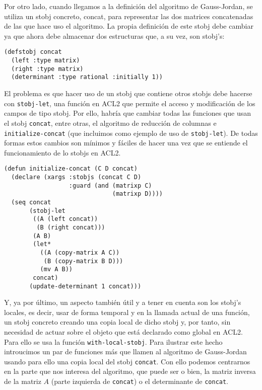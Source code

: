 \documentclass[a4paper,10pt]{article}
\begin{document}
Por otro lado, cuando llegamos a la definición del algoritmo de Gauss-Jordan, se utiliza un stobj concreto, concat, para representar las dos matrices concatenadas de las que hace uso el algoritmo. La propia definición de este stobj debe cambiar ya que ahora debe almacenar dos estructuras que, a su vez, son stobj's:

\par \vspace{10pt}

\begin{lstlisting}[language=clips]
(defstobj concat
  (left :type matrix)
  (right :type matrix)
  (determinant :type rational :initially 1))
\end{lstlisting}

\par \vspace{10pt}

El problema es que hacer uso de un stobj que contiene otros stobjs debe hacerse con \texttt{stobj-let}, una función en ACL2 que permite el acceso y modificación de los campos de tipo stobj. Por ello, habría que cambiar todas las funciones que usan el stobj \texttt{concat}, entre otras, el algoritmo de reducción de columnas e \texttt{initialize-concat} (que incluimos como ejemplo de uso de \texttt{stobj-let}). De todas formas estos cambios son mínimos y fáciles de hacer una vez que se entiende el funcionamiento de lo stobjs en ACL2.
 
\par \vspace{10pt}

\begin{lstlisting}[language=clips]
(defun initialize-concat (C D concat)
  (declare (xargs :stobjs (concat C D)
                  :guard (and (matrixp C)
                              (matrixp D))))
  (seq concat
       (stobj-let
        ((A (left concat))
         (B (right concat)))
        (A B)
        (let*
          ((A (copy-matrix A C))
           (B (copy-matrix B D)))
          (mv A B))
        concat)
       (update-determinant 1 concat)))
\end{lstlisting}

\par \vspace{10pt}

Y, ya por último, un aspecto también útil y a tener en cuenta son los stobj's locales, es decir, usar de forma temporal y en la llamada actual de una función, un stobj concreto creando una copia local de dicho stobj y, por tanto, sin necesidad de actuar sobre el objeto que está declarado como global en ACL2. Para ello se usa la función \texttt{with-local-stobj}. Para ilustrar este hecho introucimos un par de funciones más que llamen al algoritmo de Gauss-Jordan usando para ello una copia local del stobj \texttt{concat}. Con ello podemos centrarnos en la parte que nos interesa del algoritmo, que puede ser o bien, la matriz inversa de la matriz $A$ (parte izquierda de \texttt{concat}) o el determinante de \texttt{concat}.
\end{document}
